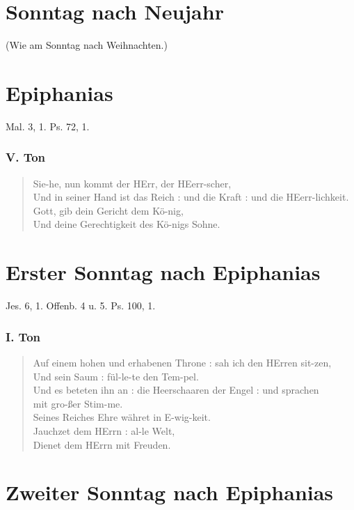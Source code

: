 \section{Sonntag nach Neujahr}

(Wie am Sonntag nach Weihnachten.)

\section{Epiphanias}

Mal. 3, 1. Ps. 72, 1.

\subsubsection{V. Ton}
\begin{verse}
Sie-he, nun kommt der HErr, der HEerr-scher,\\
Und in seiner Hand ist das Reich : und die Kraft : und die HEerr-lichkeit.\\
Gott, gib dein Gericht dem Kö-nig,\\
Und deine Gerechtigkeit des Kö-nigs Sohne.
\end{verse}

\section{Erster Sonntag nach Epiphanias}

Jes. 6, 1. Offenb. 4 u. 5. Ps. 100, 1.

\subsubsection{I. Ton}
\begin{verse}
Auf einem hohen und erhabenen Throne : sah ich den HErren sit-zen,\\
Und sein Saum : fül-le-te den Tem-pel.\\
Und es beteten ihn an : die Heerschaaren der Engel : und sprachen\\
mit gro-ßer Stim-me.\\
Seines Reiches Ehre währet in E-wig-keit.\\
Jauchzet dem HErrn : al-le Welt,\\
Dienet dem HErrn mit Freuden.
\end{verse}

\section{Zweiter Sonntag nach Epiphanias}

